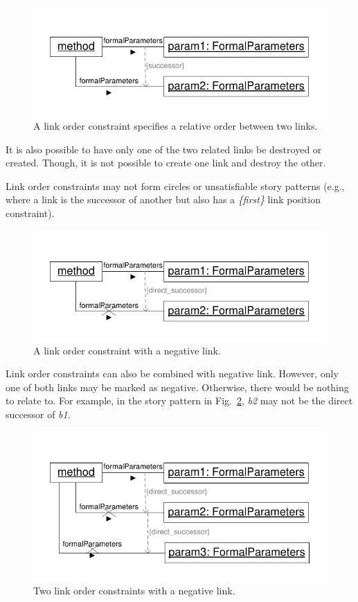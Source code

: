 {

\begin{figure}[htbp]
\center
\includegraphics[width=0.75\columnwidth]{figures/LinkOrderConstraintSuccessor}
\caption{A link order constraint specifies a relative order between two links.}
\label{fig:linkOrderConstraints:linkOrderConstaint1}
\end{figure}

It is also possible to have only one of the two related links be destroyed or created. Though, it is not possible to create one link and destroy the other.

Link order constraints may not form circles or unsatisfiable story patterns (e.g., where a link is the successor of another but also has a \emph{\{first\}} link position constraint).

\begin{figure}[htbp]
\center
\includegraphics[width=0.75\columnwidth]{figures/LinkOrderConstraintDirectSuccessorNegative}
\caption{A link order constraint with a negative link.}
\label{fig:linkOrderConstraints:linkOrderConstaint2}
\end{figure}

Link order constraints can also be combined with negative link. However, only one of both links may be marked as negative. Otherwise, there would be nothing to relate to. For example, in the story pattern in Fig.~\ref{fig:linkOrderConstraints:linkOrderConstaint2}, \emph{b2} may not be the direct successor of \emph{b1}.

\begin{figure}[htbp]
\center
\includegraphics[width=0.75\columnwidth]{figures/LinkOrderConstraintDirectSuccessorNegative2}
\caption{Two link order constraints with a negative link.}
\label{fig:linkOrderConstraints:linkOrderConstaint3}
\end{figure}

}
